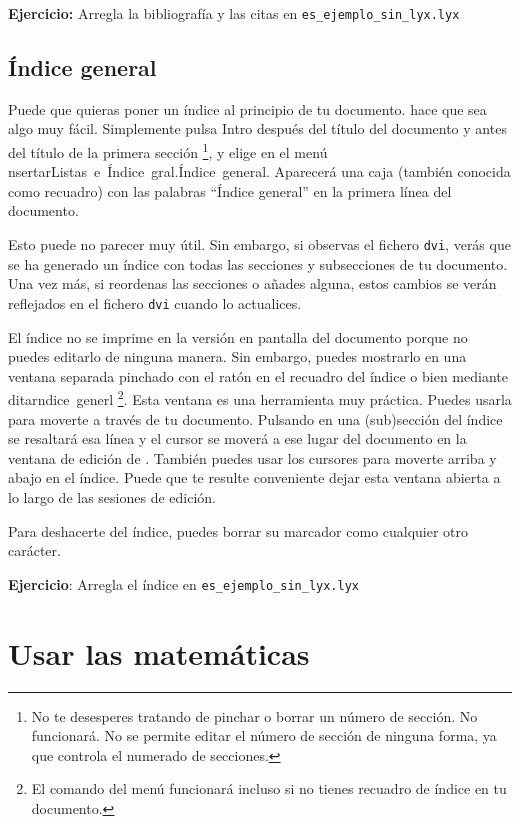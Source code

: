 \textbf{Ejercicio:} Arregla la bibliografía y las citas en \texttt{es\_ejemplo\_sin\_lyx.lyx}


\subsection{Índice general}

Puede que quieras poner un índice al principio de tu documento. \LyX{}
hace que sea algo muy fácil. Simplemente pulsa \textsf{Intro} después
del título del documento y antes del título de la primera sección%
\footnote{No te desesperes tratando de pinchar o borrar un número de sección.
No funcionará. No se permite editar el número de sección de ninguna
forma, ya que \LyX{} controla el numerado de secciones.%
}, y elige en el menú \textsf{}\textsf{nsertar\lyxarrow{}Listas~e~Índice~gral.\lyxarrow{}Índice~general}.
Aparecerá una caja (también conocida como recuadro) con las palabras
{}``Índice general'' en la primera línea del documento.

Esto puede no parecer muy útil. Sin embargo, si observas el fichero
\texttt{dvi}, verás que se ha generado un índice con todas las secciones
y subsecciones de tu documento. Una vez más, si reordenas las secciones
o añades alguna, estos cambios se verán reflejados en el fichero \texttt{dvi}
cuando lo actualices.

El índice no se imprime en la versión en pantalla del documento porque
no puedes editarlo de ninguna manera. Sin embargo, puedes mostrarlo
en una ventana separada pinchado con el ratón en el recuadro del índice
o bien mediante \textsf{}\textsf{ditar\lyxarrow{}}\textsf{}\textsf{ndice~gener}\textsf{}\textsf{l}%
\footnote{El comando del menú funcionará incluso si no tienes recuadro de índice
en tu documento.%
}\textsf{. Esta ventana es una herramienta muy práctica. Puedes usarla
para moverte a través de tu documento. Pulsando en una (sub)sección
del índice se resaltará esa línea y el cursor se moverá a ese lugar
del documento en la ventana de edición de \LyX{}. También puedes usar
los cursores para moverte arriba y abajo en el índice. Puede que te
resulte conveniente dejar esta ventana abierta a lo largo de las sesiones
de edición.}

Para deshacerte del índice, puedes borrar su marcador como cualquier
otro carácter.

\textbf{Ejercicio}: Arregla el índice en \texttt{es\_ejemplo\_sin\_lyx.lyx}


\section{Usar las matemáticas}

